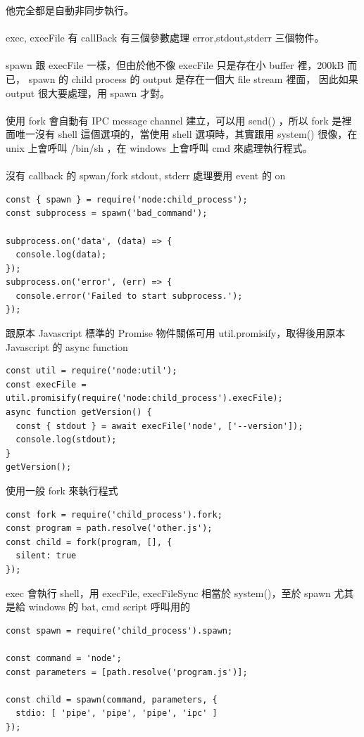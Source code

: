   他完全都是自動非同步執行。
  \\\\
  exec, execFile 有 callBack 有三個參數處理 error,stdout,stderr 三個物件。
  \\\\
  spawn 跟 execFile 一樣，但由於他不像 execFile 只是存在小 buffer 裡，200kB
  而已， spawn 的 child process 的 output 是存在一個大 file stream 裡面，
  因此如果 output 很大要處理，用 spawn 才對。
  \\\\
  使用 fork 會自動有 IPC message channel 建立，可以用 send() ，所以 fork
  是裡面唯一沒有 shell 這個選項的，當使用 shell 選項時，其實跟用 system()
  很像，在 unix 上會呼叫 /bin/sh ，在 windows 上會呼叫 cmd 來處理執行程式。
  \\\\
  沒有 callback 的 spwan/fork stdout, stderr 處理要用 event 的 on
  \begin{verbatim}
const { spawn } = require('node:child_process');
const subprocess = spawn('bad_command');

subprocess.on('data', (data) => {
  console.log(data);
});
subprocess.on('error', (err) => {
  console.error('Failed to start subprocess.');
});
  \end{verbatim}
  跟原本 Javascript 標準的 Promise  
  物件關係可用 util.promisify，取得後用原本 Javascript 的 async function
  \begin{verbatim}
const util = require('node:util');
const execFile = util.promisify(require('node:child_process').execFile);
async function getVersion() {
  const { stdout } = await execFile('node', ['--version']);
  console.log(stdout);
}
getVersion();
  \end{verbatim}
  使用一般 fork 來執行程式
  \begin{verbatim}
const fork = require('child_process').fork;
const program = path.resolve('other.js');
const child = fork(program, [], {
  silent: true
});
  \end{verbatim}
  exec 會執行 shell，用 execFile, execFileSync 相當於 system()，至於
  spawn 尤其是給 windows 的 bat, cmd script 呼叫用的
  \begin{verbatim}
const spawn = require('child_process').spawn;

const command = 'node';
const parameters = [path.resolve('program.js')];

const child = spawn(command, parameters, {
  stdio: [ 'pipe', 'pipe', 'pipe', 'ipc' ]
});
  \end{verbatim}
